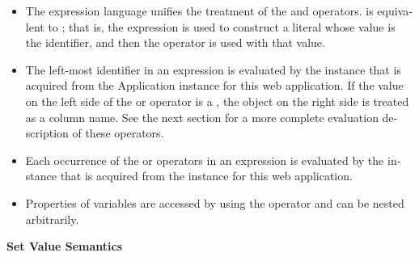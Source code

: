 \liststyleWWNumxvi
\begin{itemize}
\item \foreignlanguage{english}{The expression language unifies the
treatment of the
}\foreignlanguage{english}{
and
}\foreignlanguage{english}{
operators.
}\foreignlanguage{english}{
is equivalent to
}\foreignlanguage{english}{;
that is, the expression
}\foreignlanguage{english}{
is used to construct a literal whose value is the identifier, and then
the
}\foreignlanguage{english}{
operator is used with that value. }
\item \foreignlanguage{english}{The left-most identifier in an
expression is evaluated by the
}\foreignlanguage{english}{
instance that is acquired from the Application instance for this web
application. If the value on the left side of the
}\foreignlanguage{english}{
or
}\foreignlanguage{english}{
operator is a
}\foreignlanguage{english}{,
the object on the right side is treated as a column name. See the next
section for a more complete evaluation description of these operators.
}
\item \foreignlanguage{english}{Each occurrence of the
}\foreignlanguage{english}{
or
}\foreignlanguage{english}{
operators in an expression is evaluated by the
}\foreignlanguage{english}{instance that is acquired from the
}\foreignlanguage{english}{
instance for this web application. }
\item \foreignlanguage{english}{Properties of variables are accessed by
using the
}\foreignlanguage{english}{
operator and can be nested arbitrarily. }
\end{itemize}
{\bfseries
\foreignlanguage{english}{Set Value Semantics}}

